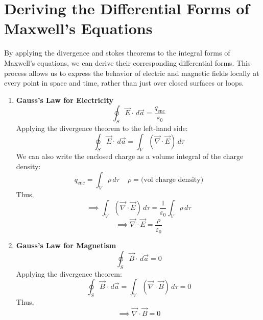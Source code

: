 \documentclass[12pt]{article}
\begin{document}
\section*{Deriving the Differential Forms of Maxwell's Equations}
By applying the divergence and stokes theorems to the integral forms of Maxwell's equations, we can derive their corresponding differential forms. This process allows us to express the behavior of electric and magnetic fields locally at every point in space and time, rather than just over closed surfaces or loops.
\begin{enumerate}
    \item \textbf{Gauss's Law for Electricity}
\[\oint_S \vec{E}\cdot\,d\vec{a}=\frac{q_{\text{enc}}}{\varepsilon_0}\]
Applying the divergence theorem to the left-hand side:
\[\oint_S \vec{E}\cdot\,d\vec{a}=\int_V (\vec{\nabla}\cdot\vec{E})\,d\tau\]
We can also write the enclosed charge as a volume integral of the charge density:
\[q_{\text{enc}}=\int_V \rho\,d\tau\,\quad \rho=\text{(vol charge density)}\]
Thus,
\[\implies \int_V (\vec{\nabla}\cdot\vec{E})\,d\tau = \frac{1}{\varepsilon_0} \int_V \rho\,d\tau\]
\[\implies \boxed{\vec{\nabla}\cdot\vec{E} = \frac{\rho}{\varepsilon_0}}\]

    \item \textbf{Gauss's Law for Magnetism}
\[\oint_S \vec{B}\cdot\,d\vec{a}=0\]
Applying the divergence theorem:
\[\oint_S \vec{B}\cdot\,d\vec{a}=\int_V (\vec{\nabla}\cdot\vec{B})\,d\tau = 0\]
Thus,
\[\implies \boxed{\vec{\nabla}\cdot\vec{B} = 0}\]


\end{enumerate}
\end{document}
